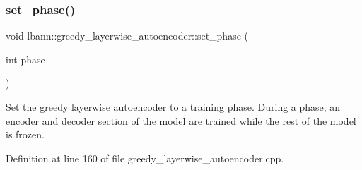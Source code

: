 \subsubsection{\texorpdfstring{set\+\_\+phase()}{set\_phase()}}
{\footnotesize\ttfamily void lbann\+::greedy\+\_\+layerwise\+\_\+autoencoder\+::set\+\_\+phase (\begin{DoxyParamCaption}\item[{int}]{phase }\end{DoxyParamCaption})\hspace{0.3cm}{\ttfamily [protected]}}

Set the greedy layerwise autoencoder to a training phase. During a phase, an encoder and decoder section of the model are trained while the rest of the model is frozen. 

Definition at line 160 of file greedy\+\_\+layerwise\+\_\+autoencoder.\+cpp.


